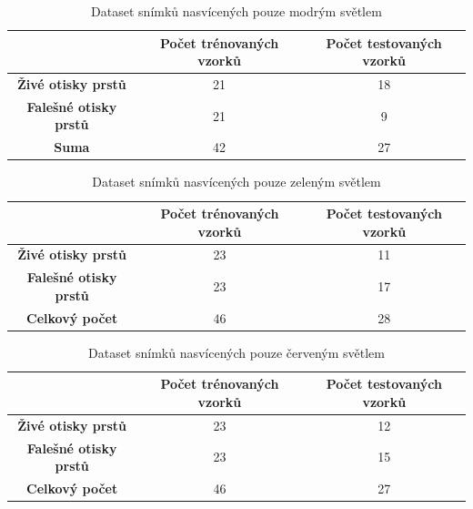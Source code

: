 \capstartfalse
\begin{table}[!htbp]
\centering
\begin{tabular}{|c|c|c|}
\hline
\textbf{}                     & \textbf{Počet trénovaných vzorků} & \textbf{Počet testovaných vzorků} \\ \hline
\textbf{Živé otisky prstů}    & 21                                & 18                                \\ \hline
\textbf{Falešné otisky prstů} & 21                                & 9                                \\ \hline
\textbf{Suma}               & 42                                & 27                                \\ \hline
\end{tabular}
\caption{Dataset snímků nasvícených pouze modrým světlem}
\end{table}
\capstarttrue

\capstartfalse
\begin{table}[!htbp]
\centering
\begin{tabular}{|c|c|c|}
\hline
\textbf{}                     & \textbf{Počet trénovaných vzorků} & \textbf{Počet testovaných vzorků} \\ \hline
\textbf{Živé otisky prstů}    & 23                                & 11                                \\ \hline
\textbf{Falešné otisky prstů} & 23                                & 17                                \\ \hline
\textbf{Celkový počet}               & 46                                & 28                                \\ \hline
\end{tabular}
\caption{Dataset snímků nasvícených pouze zeleným světlem}
\end{table}
\capstarttrue

\capstartfalse
\begin{table}[!htbp]
\centering
\begin{tabular}{|c|c|c|}
\hline
\textbf{}                     & \textbf{Počet trénovaných vzorků} & \textbf{Počet testovaných vzorků} \\ \hline
\textbf{Živé otisky prstů}    & 23                                & 12                                \\ \hline
\textbf{Falešné otisky prstů} & 23                                & 15                                \\ \hline
\textbf{Celkový počet}               & 46                                & 27                                \\ \hline
\end{tabular}
\caption{Dataset snímků nasvícených pouze červeným světlem}
\end{table}
\capstarttrue

